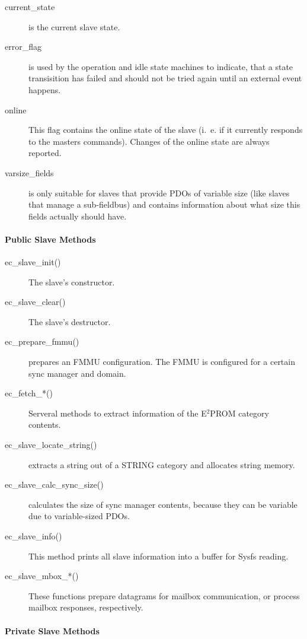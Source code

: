 \documentclass[a4paper,12pt,BCOR6mm,bibtotoc,idxtotoc]{scrbook}
\begin{document}
\begin{description}
\item[current\_state] is the current slave state.
\item[error\_flag] is used by the operation and idle state machines
  to indicate, that a state transisition has failed and should not be
  tried again until an external event happens.
\item[online] This flag contains the online state of the slave (i.~e.
  if it currently responds to the masters commands). Changes of the
  online state are always reported.
\item[varsize\_fields] is only suitable for slaves that provide PDOs
  of variable size (like slaves that manage a sub-fieldbus) and
  contains information about what size this fields actually should
  have.
\end{description}

\paragraph{Public Slave Methods}

\begin{description}
\item[ec\_slave\_init()] The slave's constructor.
\item[ec\_slave\_clear()] The slave's destructor.
\item[ec\_prepare\_fmmu()] prepares an FMMU configuration. The FMMU is
  configured for a certain sync manager and domain.
\item[ec\_fetch\_*()] Serveral methods to extract information of the
  E$^2$PROM category contents.
\item[ec\_slave\_locate\_string()] extracts a string out of a STRING
  category and allocates string memory.
\item[ec\_slave\_calc\_sync\_size()] calculates the size of sync
  manager contents, because they can be variable due to variable-sized
  PDOs.
\item[ec\_slave\_info()] This method prints all slave information into
  a buffer for Sysfs reading.
\item[ec\_slave\_mbox\_*()] These functions prepare datagrams for
  mailbox communication, or process mailbox responses, respectively.
\end{description}

\paragraph{Private Slave Methods}
\end{document}
